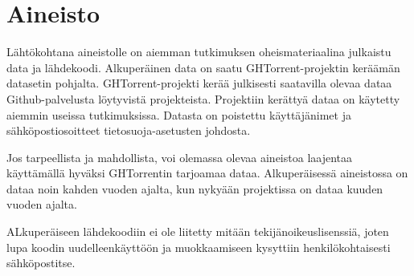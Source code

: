 \documentclass[utf8]{gradu3}
\begin{document}
\chapter{Aineisto}
Lähtökohtana aineistolle on aiemman tutkimuksen \parencite{riivo-2016}
oheismateriaalina julkaistu data ja lähdekoodi. Alkuperäinen data on saatu
GHTorrent-projektin \parencite{Gousi13} keräämän datasetin pohjalta.
GHTorrent-projekti kerää julkisesti saatavilla olevaa dataa Github-palvelusta
löytyvistä projekteista. Projektiin kerättyä dataa on käytetty aiemmin useissa
tutkimuksissa. Datasta on poistettu käyttäjänimet ja sähköpostiosoitteet
tietosuoja-asetusten johdosta.

Jos tarpeellista ja mahdollista, voi olemassa olevaa aineistoa laajentaa
käyttämällä hyväksi GHTorrentin tarjoamaa dataa. Alkuperäisessä aineistossa on
dataa noin kahden vuoden ajalta, kun nykyään projektissa on dataa kuuden vuoden
ajalta.

ALkuperäiseen lähdekoodiin ei ole liitetty mitään tekijänoikeuslisenssiä, joten
lupa koodin uudelleenkäyttöön ja muokkaamiseen kysyttiin henkilökohtaisesti
sähköpostitse.

%
\end{document}
